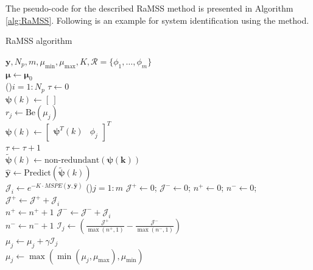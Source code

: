 The pseudo-code for the described RaMSS method is presented in Algorithm \ref{alg:RaMSS}. Following is an example for system identification using the method.

\begin{algorithm}[htpb]
  \caption{RaMSS algorithm}\label{alg:RaMSS}
  $\bm{y},N_p,m,\mu_{\min},\mu_{\max},K,\mathscr{R}=\{\phi_{1},\dots,\phi_{m}\}$ \\
   {
     $ \bm{\mu} \gets \bm{\mu}_0$ \\
     \For(){$i=1:N_p$}
      {
         $\tau \gets 0$ \\
         $\bm{\psi}(k) \gets [\ ]$  \\
         {
           $r_j \gets \text{Be}(\mu_j)$ \\
            {
            $\bm{\psi}(k) \gets \begin{bmatrix} \bm{\psi}^T(k) & \phi_j \end{bmatrix}^T $ \\
            $\tau \gets \tau + 1$ \\
            }
         }
         {
           $\tilde{\bm{\psi}}(k) \gets \text{non-redundant}(\bm{\psi(k)})$ \\
         }
         $\hat{\bm{y}} \gets \text{Predict}(\tilde{\bm{\psi}}(k))$ \\
         $\mathcal{J}_i \gets e^{-K\cdot MSPE(\bm{y},\bm{\hat{y}})} $
      }
      \For(){$j=1:m$}
      {
         $\mathcal{J}^{+} \gets 0$; $ \mathcal{J}^{-} \gets 0$; $n^{+} \gets 0$; $n^{-} \gets 0$; \\
         {
            {
               $\mathcal{J}^{+} \gets \mathcal{J}^{+} + \mathcal{J}_i$ \\
               $n^{+} \gets n^{+} + 1$
            } \Else
            {
               $\mathcal{J}^{-} \gets \mathcal{J}^{-} + \mathcal{J}_i$ \\
               $n^{-} \gets n^{-} + 1$
            }
          }
            $\mathcal{I}_j \gets \left( \frac{\mathcal{J}^{+}}{\max(n^+,1)} - \frac{\mathcal{J}^{-}}{\max(n^-,1)} \right) $ \\
         $\mu_j \gets \mu_j + \gamma \mathcal{I}_j$ \\
         $\mu_j \gets \max \left( \min(\mu_j, \mu_{\max}), \mu_{\min} \right) $ \\
         
      }
   }
\end{algorithm}%

